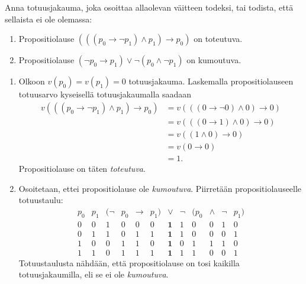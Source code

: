 \documentclass[11pt,a4paper]{amsart}
\begin{document}
\begin{exercise}
Anna totuusjakauma, joka osoittaa allaolevan väitteen todeksi, tai todista,
että sellaista ei ole olemassa:
\begin{enumerate}[label=\alph*), nosep]
\item Propositiolause \((((p_0 \rightarrow \neg p_1) \land p_1)
\rightarrow p_0)\) on toteutuva.

\item Propositiolause \((\neg p_0 \rightarrow p_1) \lor \neg(p_0
\land \neg p_1)\) on kumoutuva.
\end{enumerate}
\end{exercise}

\begin{solution}
\leavevmode\par
\begin{enumerate}[label=\alph*), nosep]
\item Olkoon \(v(p_0) = v(p_1) = 0\) totuusjakauma. Laskemalla
propositiolauseen totuusarvo kyseisellä totuusjakaumalla saadaan
\[
\begin{aligned}
v(((p_0 \rightarrow \neg p_1) \land p_1)\rightarrow p_0)
&= v(((0 \rightarrow \neg 0) \land 0) \rightarrow 0) \\
&= v(((0 \rightarrow 1) \land 0) \rightarrow 0) \\
&= v((1 \land 0) \rightarrow 0) \\
&= v(0 \rightarrow 0) \\
&= 1.
\end{aligned}
\]
Propositiolause on täten \emph{toteutuva}.

\item Osoitetaan, ettei propositiolause ole \emph{kumoutuva}. Piirretään
propositiolauseelle totuustaulu:
\[
\begin{array}{cc|cccccccccc}
p_0 & p_1 & (\neg & p_0 & \rightarrow & p_1) & \boldsymbol{\lor} & \neg
& (p_0 & \land & \neg & p_1) \\
\hline
0 & 0 & 1 & 0 & 0 & 0 & \mathbf{1} & 1 & 0 & 0 & 1 & 0 \\
0 & 1 & 1 & 0 & 1 & 1 & \mathbf{1} & 1 & 0 & 0 & 0 & 1 \\
1 & 0 & 0 & 1 & 1 & 0 & \mathbf{1} & 0 & 1 & 1 & 1 & 0 \\
1 & 1 & 0 & 1 & 1 & 1 & \mathbf{1} & 1 & 1 & 0 & 0 & 1
\end{array}
\]
Totuustaulusta nähdään, että propositiolause on tosi kaikilla totuusjakaumilla,
eli se ei ole \emph{kumoutuva}.
\end{enumerate}
\end{solution}
\end{document}

